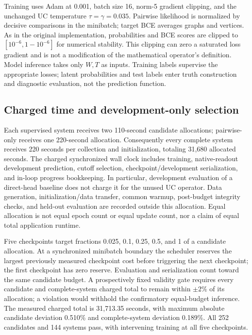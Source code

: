 Training uses Adam at 0.001, batch size 16, norm-5 gradient clipping, and the unchanged UC temperature $\tau=\gamma=0.035$. Pairwise likelihood is normalized by decisive comparisons in the minibatch; target BCE averages graphs and vertices. As in the original implementation, probabilities and BCE scores are clipped to $[10^{-6},1-10^{-6}]$ for numerical stability. This clipping can zero a saturated loss gradient and is not a modification of the mathematical operator's definition. Model inference takes only $W,T$ as inputs. Training labels supervise the appropriate losses; latent probabilities and test labels enter truth construction and diagnostic evaluation, not the prediction function.

\subsection{Charged time and development-only selection}
Each supervised system receives two 110-second candidate allocations; pairwise-only receives one 220-second allocation. Consequently every complete system receives 220 seconds per collection and initialization, totaling 31,680 allocated seconds. The charged synchronized wall clock includes training, native-readout development prediction, cutoff selection, checkpoint/development serialization, and in-loop progress bookkeeping. In particular, development evaluation of a direct-head baseline does not charge it for the unused UC operator. Data generation, initialization/data transfer, common warmup, post-budget integrity checks, and held-out evaluation are recorded outside this allocation. Equal allocation is not equal epoch count or equal update count, nor a claim of equal total application runtime.

Five checkpoints target fractions 0.025, 0.1, 0.25, 0.5, and 1 of a candidate allocation. At a synchronized minibatch boundary the scheduler reserves the largest previously measured checkpoint cost before triggering the next checkpoint; the first checkpoint has zero reserve. Evaluation and serialization count toward the same candidate budget. A prospectively fixed validity gate requires every candidate and complete-system charged total to remain within $\pm2\%$ of its allocation; a violation would withhold the confirmatory equal-budget inference. The measured charged total is 31,713.35 seconds, with maximum absolute candidate deviation 0.510\% and complete-system deviation 0.189\%. All 252 candidates and 144 systems pass, with intervening training at all five checkpoints.

